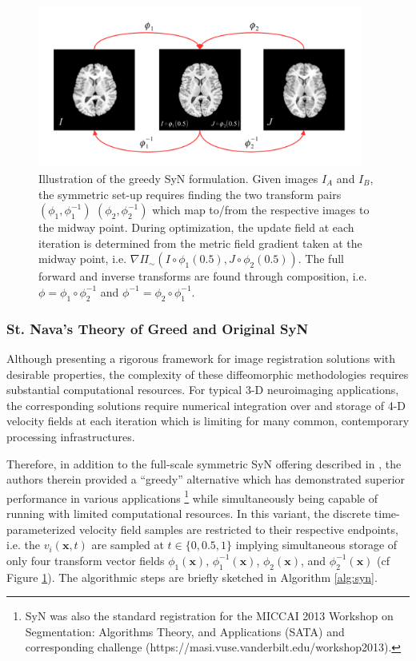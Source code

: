 \documentclass{frontiersSCNS}
\begin{document}
\begin{figure}[htb]
  \centering
  \includegraphics[width=0.95\textwidth]{SyN.pdf}
  \caption{Illustration of the greedy SyN formulation.  Given images
  $I_A$ and $I_B$, the symmetric set-up requires finding the two
  transform pairs $\left(\phi_1,\phi_1^{-1}\right)$
  $\left(\phi_2,\phi_2^{-1}\right)$ which map to/from
  the respective images to the midway point. During
  optimization, the update field at each iteration is
  determined from the metric field gradient taken at
  the midway point, i.e.
  $\nabla \Pi_{\sim} \left(I\circ\phi_1(0.5),J\circ\phi_2(0.5)\right)$.
  The full
  forward and inverse transforms are found through
  composition, i.e. $\phi=\phi_1 \circ \phi_2^{-1}$ and
  $\phi^{-1}=\phi_2 \circ \phi_1^{-1}$.
  }
  \label{fig:syn}
\end{figure}

\subsubsection{St. Nava's Theory of Greed and Original SyN}

Although presenting a rigorous framework for image registration solutions
with desirable properties, the complexity of these diffeomorphic methodologies
requires substantial computational resources.  For typical 3-D neuroimaging
applications, the corresponding solutions require numerical integration over
and storage of 4-D velocity fields at each iteration which is limiting for
many common, contemporary processing infrastructures.

Therefore, in addition to the full-scale
symmetric SyN offering described in \cite{avants2008}, the authors therein
provided a ``greedy'' alternative which has demonstrated superior performance
in various applications \citep{avants2011,klein2009,murphy2011}%
\footnote{
SyN was also the standard registration for the MICCAI 2013
Workshop on Segmentation:  Algorithms Theory, and Applications (SATA)
and corresponding challenge (https://masi.vuse.vanderbilt.edu/workshop2013).
}
while simultaneously being capable of running with limited computational
resources.  In this variant, the discrete time-parameterized
velocity field samples are restricted to their respective
endpoints, i.e. the $v_i(\mathbf{x},t)$ are sampled at $t \in \{0,0.5,1\}$
implying simultaneous storage of only four transform vector fields
$\phi_1(\mathbf{x})$,
$\phi_1^{-1}(\mathbf{x})$, $\phi_2(\mathbf{x})$, and $\phi_2^{-1}(\mathbf{x})$
(cf Figure \ref{fig:syn}).  The algorithmic steps are briefly sketched
in Algorithm \ref{alg:syn}.
\end{document}

